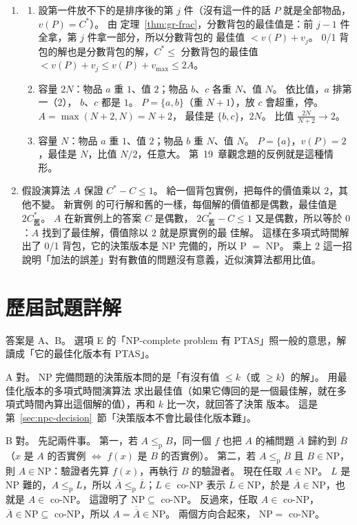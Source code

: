\begin{enumerate}
\item
\begin{enumerate}
\item 設第一件放不下的是排序後的第 $j$ 件（沒有這一件的話 $P$ 就是全部物品，$v(P) = C^*$）。 由
定理~\ref{thm:gr-frac}，分數背包的最佳值是：前 $j - 1$ 件全拿，第 $j$ 件拿一部分，所以分數背包的
最佳值 $< v(P) + v_j$。 0/1 背包的解也是分數背包的解，$C^* \le$ 分數背包的最佳值
$< v(P) + v_j \le v(P) + v_{\max} \le 2A$。
\item 容量 $2N$：物品 $a$ 重 $1$、值 $2$；物品 $b$、$c$ 各重 $N$、值 $N$。 依比值，$a$ 排第一（$2$），
$b$、$c$ 都是 $1$。 $P = \{a, b\}$（重 $N + 1$），放 $c$ 會超重，停。 $A = \max(N + 2, N) = N + 2$，
最佳是 $\{b, c\}$，$2N$。 比值 $\frac{2N}{N + 2} \to 2$。
\item 容量 $N$：物品 $a$ 重 $1$、值 $2$；物品 $b$ 重 $N$、值 $N$。 $P = \{a\}$，$v(P) = 2$，最佳是
$N$，比值 $N/2$，任意大。 第~19~章觀念題的反例就是這種情形。
\end{enumerate}

\item 假設演算法 $A$ 保證 $C^* - C \le 1$。 給一個背包實例，把每件的價值乘以 $2$，其他不變。 新實例
的可行解和舊的一樣，每個解的價值都是偶數，最佳值是 $2C^*_{\text{舊}}$。 $A$ 在新實例上的答案 $C$ 是偶數，
$2C^*_{\text{舊}} - C \le 1$ 又是偶數，所以等於 $0$：$A$ 找到了最佳解，價值除以 $2$ 就是原實例的最
佳解。 這樣在多項式時間解出了 0/1 背包，它的決策版本是 NP 完備的，所以 P $=$ NP。 乘上 $2$ 這一招
說明「加法的誤差」對有數值的問題沒有意義，近似演算法都用比值。

\end{enumerate}

\section*{歷屆試題詳解}

答案是 A、B。 選項 E 的「NP-complete problem 有 PTAS」照一般的意思，解讀成「它的最佳化版本有 PTAS」。

A 對。 NP 完備問題的決策版本問的是「有沒有值 $\le k$（或 $\ge k$）的解」。 用最佳化版本的多項式時間演算法
求出最佳值（如果它傳回的是一個最佳解，就在多項式時間內算出這個解的值），再和 $k$ 比一次，就回答了決策
版本。 這是第~\ref{sec:npc-decision}~節「決策版本不會比最佳化版本難」。

B 對。 先記兩件事。 第一，若 $A \le_{\mathrm{p}} B$，同一個 $f$ 也把 $A$ 的補問題 $\overline{A}$ 歸約到
$\overline{B}$（$x$ 是 $A$ 的否實例 $\iff$ $f(x)$ 是 $B$ 的否實例）。 第二，若 $A \le_{\mathrm{p}} B$ 且
$B \in \mathrm{NP}$，則 $A \in \mathrm{NP}$：驗證者先算 $f(x)$，再執行 $B$ 的驗證者。 現在任取
$A \in \mathrm{NP}$。 $L$ 是 NP 難的，$A \le_{\mathrm{p}} L$，所以 $\overline{A} \le_{\mathrm{p}}
\overline{L}$；$L \in$ co-NP 表示 $\overline{L} \in \mathrm{NP}$，於是 $\overline{A} \in \mathrm{NP}$，也就是
$A \in$ co-NP。 這證明了 $\mathrm{NP} \subseteq$ co-NP。 反過來，任取 $A \in$ co-NP，$\overline{A} \in
\mathrm{NP} \subseteq$ co-NP，所以 $A = \overline{\overline{A}} \in \mathrm{NP}$。 兩個方向合起來，
$\mathrm{NP} =$ co-NP。


